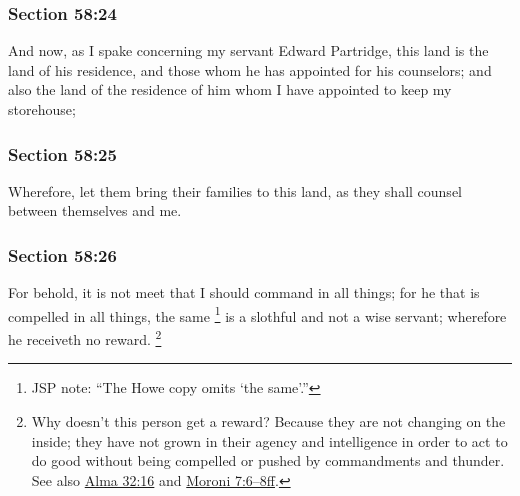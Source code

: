 	\subsubsection{Section 58:24} %
		\label{DC58-24}

		And now, as I spake concerning my servant Edward Partridge, this land is the land of his residence, and those whom he has appointed for his counselors; and also the land of the residence of him whom I have appointed to keep my storehouse;


	\subsubsection{Section 58:25} %
		\label{DC58-25}

		Wherefore, let them bring their families to this land, as they shall counsel between themselves and me.


	\subsubsection{Section 58:26} %
		\label{DC58-26}

		For behold, it is not meet that I should command in all things; for he that is compelled in all things, the same%
			\footnote{%
				JSP note: ``The Howe copy omits `the same'.''
				}
		is a slothful and not a wise servant; wherefore he receiveth no reward.%
			\footnote{%
				Why doesn't this person get a reward? Because they are not changing on the inside; they have not grown in their agency and intelligence in order to act to do good without being compelled or pushed by commandments and thunder. See also \hyperref[ALMA-32-16]{Alma 32:16} and \hyperref[MORONI-7-6]{Moroni 7:6--8ff}.
				}

